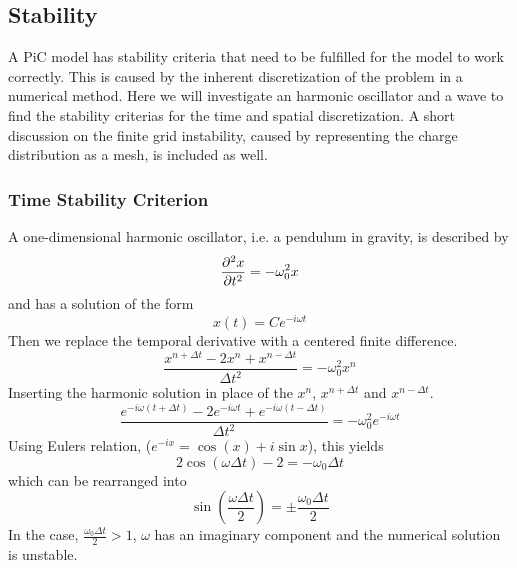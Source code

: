 \subsection{Stability}
    \label{sec:stability}
    A PiC model has stability criteria that need to be fulfilled
    for the model to work correctly. This is caused by the inherent discretization of the problem
    in a numerical method. Here we will investigate an harmonic oscillator and a
    wave to find the stability criterias for the time and spatial discretization.
	A short discussion on the finite grid instability, caused by representing the
 	charge distribution as a mesh, is included as well.

    \subsubsection{Time Stability Criterion}
        \label{sec:time_stability}
        A one-dimensional harmonic oscillator, i.e. a pendulum in gravity, is described by
        \begin{equation}
            \pdv[2]{x}{t} = - \omega_0^2 x
        \end{equation}
        and has a solution of the form
        \begin{equation}
            x(t) = C e^{-i\omega t} \label{eq:harmonic_sol}
        \end{equation}
        Then we replace the temporal derivative with a centered finite difference.
        \begin{equation}
            \frac{x^{n+\Delta t} - 2 x^{n} + x^{n-\Delta t}}{\Delta t^2} = -\omega_0^2 x^n
        \end{equation}
        Inserting the harmonic solution in place of the \(x^n\), \(x^{n+ \Delta t}\) and \(x^{n-\Delta t}\).
        \begin{equation}
            \frac{ e^{-i\omega (t + \Delta t)} -2e^{-i\omega t} + e^{-i\omega (t - \Delta t)}}{\Delta t^2} = -\omega_0^2 e^{-i\omega t}
        \end{equation}
        Using Eulers relation, (\(e^{-ix} = \cos(x) + i\sin{x}\)), this yields
        \begin{equation}
            2\cos(\omega \Delta t)- 2 = -\omega_0 \Delta t
        \end{equation}
        which can be rearranged into
        \begin{equation}
                \sin(\frac{\omega \Delta t}{2}) = \pm \frac{\omega_0 \Delta t}{2}
        \end{equation}
        In the case, \(\frac{\omega_0 \Delta t}{2} > 1\), \(\omega\) has an imaginary component
        and the numerical solution is unstable.

